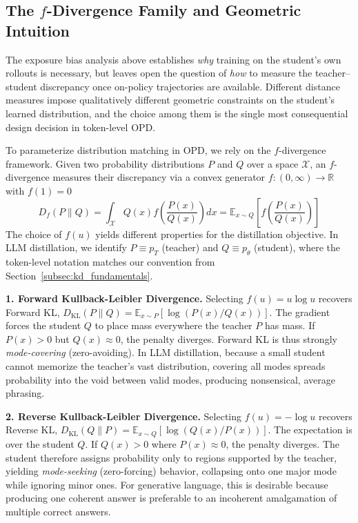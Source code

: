 \documentclass{article} %
\newcommand{\KL}{D_{\mathrm{KL}}}
\newcommand{\ptheta}{p_\theta}
\newcommand{\pteacher}{p_T}
\begin{document}
\subsection{The $f$-Divergence Family and Geometric Intuition}
\label{subsec:f_divergence}

The exposure bias analysis above establishes \emph{why} training on the student's own rollouts is necessary, but leaves open the question of \emph{how} to measure the teacher--student discrepancy once on-policy trajectories are available. Different distance measures impose qualitatively different geometric constraints on the student's learned distribution, and the choice among them is the single most consequential design decision in token-level OPD.

To parameterize distribution matching in OPD, we rely on the $f$-divergence framework. Given two probability distributions $P$ and $Q$ over a space $\mathcal{X}$, an $f$-divergence measures their discrepancy via a convex generator $f: (0, \infty) \to \mathbb{R}$ with $f(1) = 0$
\begin{equation}
    D_f(P \parallel Q) = \int_{\mathcal{X}} Q(x) f\left(\frac{P(x)}{Q(x)}\right) dx = \mathbb{E}_{x \sim Q} \left[ f\left(\frac{P(x)}{Q(x)}\right) \right]
\end{equation}
The choice of $f(u)$ yields different properties for the distillation objective. In LLM distillation, we identify $P \equiv \pteacher$ (teacher) and $Q \equiv \ptheta$ (student), where the token-level notation matches our convention from Section~\ref{subsec:kd_fundamentals}.

\textbf{1. Forward Kullback-Leibler Divergence.} Selecting $f(u) = u \log u$ recovers Forward KL, $\KL(P \parallel Q) = \mathbb{E}_{x \sim P} [ \log(P(x)/Q(x)) ]$. The gradient forces the student $Q$ to place mass everywhere the teacher $P$ has mass. If $P(x) > 0$ but $Q(x) \approx 0$, the penalty diverges. Forward KL is thus strongly \textit{mode-covering} (zero-avoiding). In LLM distillation, because a small student cannot memorize the teacher's vast distribution, covering all modes spreads probability into the void between valid modes, producing nonsensical, average phrasing.

\textbf{2. Reverse Kullback-Leibler Divergence.} Selecting $f(u) = -\log u$ recovers Reverse KL, $\KL(Q \parallel P) = \mathbb{E}_{x \sim Q} [ \log(Q(x)/P(x)) ]$. The expectation is over the student $Q$. If $Q(x) > 0$ where $P(x) \approx 0$, the penalty diverges. The student therefore assigns probability only to regions supported by the teacher, yielding \textit{mode-seeking} (zero-forcing) behavior, collapsing onto one major mode while ignoring minor ones. For generative language, this is desirable because producing one coherent answer is preferable to an incoherent amalgamation of multiple correct answers.
\end{document}
